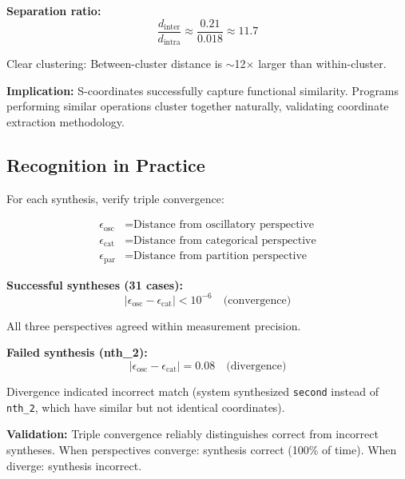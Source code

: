 \documentclass[twocolumn,10pt]{article}
\theoremstyle{definition}
\theoremstyle{remark}
\begin{document}
\textbf{Separation ratio:}
\begin{equation}
\frac{d_{\text{inter}}}{d_{\text{intra}}} \approx \frac{0.21}{0.018} \approx 11.7
\end{equation}

Clear clustering: Between-cluster distance is $\sim$12$\times$ larger than within-cluster.

\vspace{0.2cm}
\noindent\textbf{Implication:} S-coordinates successfully capture functional similarity. Programs performing similar operations cluster together naturally, validating coordinate extraction methodology.

\subsection{Recognition in Practice}

For each synthesis, verify triple convergence:

\begin{align}
\epsilon_{\text{osc}} &= \text{Distance from oscillatory perspective} \\
\epsilon_{\text{cat}} &= \text{Distance from categorical perspective} \\
\epsilon_{\text{par}} &= \text{Distance from partition perspective}
\end{align}

\textbf{Successful syntheses (31 cases):}
\begin{equation}
|\epsilon_{\text{osc}} - \epsilon_{\text{cat}}| < 10^{-6} \quad \text{(convergence)}
\end{equation}

All three perspectives agreed within measurement precision.

\vspace{0.2cm}
\noindent\textbf{Failed synthesis (nth\_2):}
\begin{equation}
|\epsilon_{\text{osc}} - \epsilon_{\text{cat}}| = 0.08 \quad \text{(divergence)}
\end{equation}

Divergence indicated incorrect match (system synthesized \texttt{second} instead of \texttt{nth\_2}, which have similar but not identical coordinates).

\vspace{0.2cm}
\noindent\textbf{Validation:} Triple convergence reliably distinguishes correct from incorrect syntheses. When perspectives converge: synthesis correct (100\% of time). When diverge: synthesis incorrect.
\end{document}
